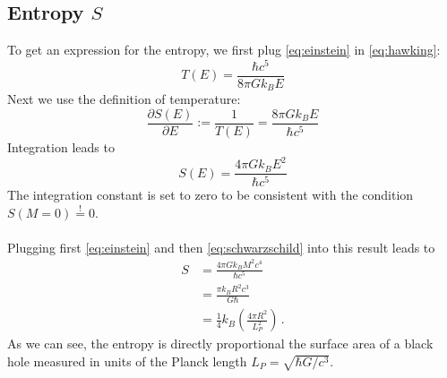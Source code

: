 \subsection{Entropy $S$}
    To get an expression for the entropy, we first plug 
    \eqref{eq:einstein} in \eqref{eq:hawking}:
    \begin{equation}
        T(E)=\frac{\hbar c^5}{8\pi Gk_BE}
    \end{equation}
    Next we use the definition of temperature:
    \begin{equation}
        \frac{\partial S(E)}{\partial E}:=\frac{1}{T(E)}
        =\frac{8\pi Gk_BE}{\hbar c^5}
    \end{equation}
    Integration leads to
    \begin{equation}
        S(E)=\frac{4\pi Gk_BE^2}{\hbar c^5}
    \end{equation}
    The integration constant is set to zero to be consistent with 
    the condition $S(M=0)\overset{!}{=}0$. \\
    \\
    Plugging first \eqref{eq:einstein} and then \eqref{eq:schwarzschild} 
    into this result leads to
    \begin{align}
        S
        &=\frac{4\pi Gk_BM^2c^4}{\hbar c^5} \\
        &=\frac{\pi k_BR^2c^3}{G\hbar} \\
        &=\frac{1}{4}k_B\left(\frac{4\pi R^2}{L_P^2}\right) \,.
    \end{align}
    As we can see, the entropy is directly proportional the surface area of a 
    black hole measured in units of the Planck length $L_P=\sqrt{\hbar G/c^3}$.

